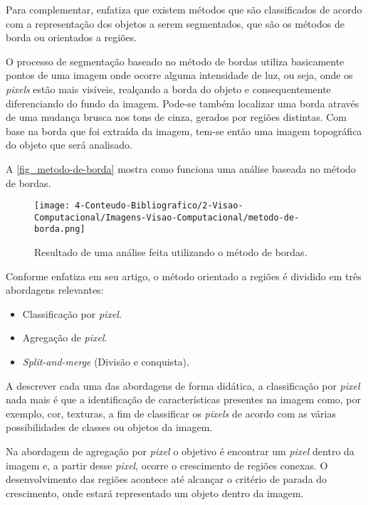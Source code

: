 Para complementar,  enfatiza que existem métodos que são classificados de acordo com a representação dos objetos a serem segmentados, que são os métodos de borda ou orientados a regiões.

O processo de segmentação baseado no método de bordas utiliza basicamente pontos de uma imagem onde ocorre alguma intensidade de luz, ou seja, onde os \textit{pixels} estão mais visíveis, realçando a borda do objeto e consequentemente diferenciando do fundo da imagem. Pode-se também localizar uma borda através de uma mudança brusca nos tons de cinza, gerados por regiões distintas. Com base na borda que foi extraída da imagem, tem-se então uma imagem topográfica do objeto que será analisado.

A \autoref{fig_metodo-de-borda} mostra como funciona uma análise baseada no método de bordas.

\begin{figure}[h]
	\caption{\label{fig_metodo-de-borda}Resultado de uma análise feita utilizando o método de bordas.}
	\begin{center}
		\texttt{[image: 4-Conteudo-Bibliografico/2-Visao-Computacional/Imagens-Visao-Computacional/metodo-de-borda.png]}
	\end{center}
	\centering {}
\end{figure}

Conforme  enfatiza em seu artigo, o método orientado a regiões é dividido em três abordagens relevantes:

\begin{itemize}
   \item Classificação por \textit{pixel}.
   \item Agregação de \textit{pixel}.
   \item \textit{Split-and-merge} (Divisão e conquista).
 \end{itemize}

A descrever cada uma das abordagens de forma didática, a classificação por \textit{pixel} nada mais é que a identificação de características presentes na imagem como, por exemplo, cor, texturas, a fim de classificar os \textit{pixels} de acordo com as várias possibilidades de classes ou objetos da imagem.

Na abordagem de agregação por \textit{pixel} o objetivo é encontrar um \textit{pixel} dentro da imagem e, a partir desse \textit{pixel}, ocorre o crescimento de regiões conexas. O desenvolvimento das regiões acontece até alcançar o critério de parada do crescimento, onde estará representado um objeto dentro da imagem.

